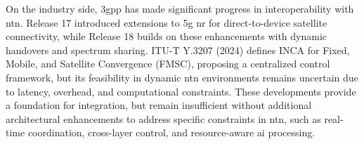 On the industry side, \gls{3gpp} has made significant progress in interoperability with \gls{ntn}. Release 17 introduced extensions to \gls{5g} \gls{nr} for direct-to-device satellite connectivity, while Release 18 builds on these enhancements with dynamic handovers and spectrum sharing.  ITU-T Y.3207 (2024) defines INCA for Fixed, Mobile, and Satellite Convergence (FMSC), proposing a centralized control framework, but its feasibility in dynamic \gls{ntn} environments remains uncertain due to latency, overhead, and computational constraints. These developments provide a foundation for integration, but remain insufficient without additional architectural enhancements to address specific constraints in \gls{ntn}, such as real-time coordination, cross-layer control, and resource-aware \gls{ai} processing.



